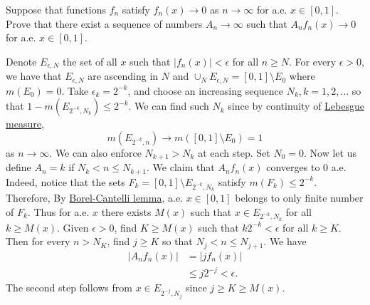   \begin{exercise}
    Suppose that functions $f_n$ satisfy $f_n(x) \rightarrow 0$ as $n \rightarrow \infty$ for a.e. $x \in [0, 1]$. Prove that there exist a sequence of numbers $A_n \rightarrow \infty$ such that $A_n f_n(x) \rightarrow 0$ for a.e. $x \in [0, 1]$.
  \end{exercise}
  \begin{solution}
    Denote $E_{\epsilon,N}$ the set of all $x$ such that $|f_n(x)| < \epsilon$ for all $n \ge N$. For every $\epsilon > 0$, we have that $E_{\epsilon,N}$ are ascending in $N$ and $\cup_N E_{\epsilon,N} = [0, 1] \setminus E_0$ where $m(E_0) = 0$. Take $\epsilon_k = 2^{-k}$, and choose an increasing sequence $N_k, k = 1, 2, \dots$ so that $1 - m(E_{2^{-k}, N_k}) \le 2^{-k}$. We can find such $N_k$ since by continuity of \hyperref[def:lebesgue-measure]{Lebesgue measure},
    \begin{equation}
      m(E_{2^{-k},n}) \rightarrow m([0, 1] \setminus E_0) = 1
    \end{equation}
    as $n \rightarrow \infty$. We can also enforce $N_{k+1} > N_k$ at each step. Set $N_0 = 0$. Now let us define $A_n = k$ if $N_k < n \le N_{k+1}$. We claim that $A_n f_n(x)$ converges to 0 a.e. Indeed, notice that the sets $F_k = [0, 1] \setminus E_{2^{-k}, N_k}$ satisfy $m(F_k) \le 2^{-k}$. Therefore, By \hyperref[thm:borel-cantelli-lemma]{Borel-Cantelli lemma}, a.e. $x \in [0, 1]$ belongs to only finite number of $F_k$. Thus for a.e. $x$ there exists $M(x)$ such that $x \in E_{2^{-k}, N_k}$ for all $k \ge M(x)$. Given $\epsilon > 0$, find $K \ge M(x)$ such that $k2^{-k} < \epsilon$ for all $k \ge K$. Then for every $n > N_K$, find $j \ge K$ so that $N_j < n \le N_{j+1}$. We have
    \begin{align}
      |A_n f_n(x)| &= |j f_n(x)| \\
      &\le j2^{-j} < \epsilon.
    \end{align}
    The second step follows from $x \in E_{2^{-j}, N_j}$ since $j \ge K \ge M(x)$.
  \end{solution}

